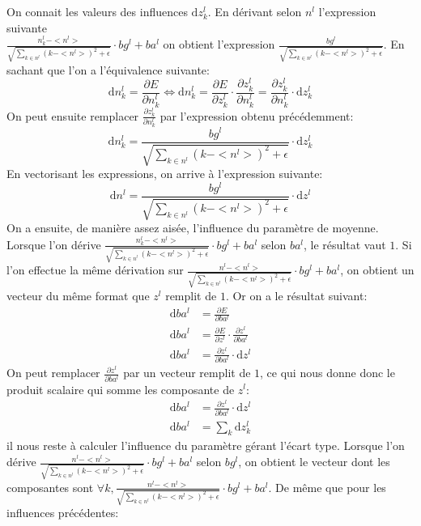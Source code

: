 \documentclass[12pt,a4paper]{extarticle}
\newcommand{\ud}{\mathrm{d}}
\begin{document}
On connait les valeurs des influences $\ud z^l_k$. En dérivant selon $n^l$ l'expression suivante \\ $\frac{n^l_k-<n^l>}{\sqrt{\sum_{k\in n^l}(k-<n^l>)^2+\epsilon}}\cdot bg^l + ba^l$ on obtient l'expression $\frac{bg^l}{\sqrt{\sum_{k\in n^l}(k-<n^l>)^2+\epsilon}}$. En sachant que l'on a l'équivalence suivante:
\begin{equation}
\ud n^l_k = \frac{\partial E}{\partial n^l_k} \Leftrightarrow \ud n^l_k = \frac{\partial E}{\partial z^l_k}\cdot \frac{\partial z^l_k}{\partial n^l_k}=\frac{\partial z^l_k}{\partial n^l_k}\cdot \ud z^l_k
\end{equation}
On peut ensuite remplacer $\frac{\partial z^l_k}{\partial n^l_k}$ par l'expression obtenu précédemment:
\begin{equation}
\ud n^l_k = \frac{bg^l}{\sqrt{\sum_{k\in n^l}(k-<n^l>)^2+\epsilon}}\cdot \ud z^l_k
\end{equation}
En vectorisant les expressions, on arrive à l'expression suivante:
\begin{equation}
\ud n^l = \frac{bg^l}{\sqrt{\sum_{k\in n^l}(k-<n^l>)^2+\epsilon}}\cdot \ud z^l
\end{equation}
On a ensuite, de manière assez aisée, l'influence du paramètre de moyenne. Lorsque l'on dérive $\frac{n^l_k-<n^l>}{\sqrt{\sum_{k\in n^l}(k-<n^l>)^2+\epsilon}}\cdot bg^l + ba^l $ selon $ba^l $, le résultat vaut $1$. Si l'on effectue la même dérivation sur  $ \frac{n^l-<n^l>}{\sqrt{\sum_{k\in n^l}(k-<n^l>)^2+\epsilon}}\cdot bg^l + ba^l $, on obtient un vecteur du même format que $z^l$ remplit de $1$. Or on a le résultat suivant:
\begin{align}
\ud ba^l &= \frac{\partial E}{\partial ba^l}\\
\ud ba^l &= \frac{\partial E}{\partial z^l}\cdot\frac{\partial z^l}{\partial ba^l} \\
\ud ba^l &= \frac{\partial z^l}{\partial ba^l}\cdot \ud z^l 
\end{align}
On peut remplacer $\frac{\partial z^l}{\partial ba^l}$ par un vecteur remplit de $1$, ce qui nous donne donc le produit scalaire qui somme les composante de $z^l$:
\begin{align}
\ud ba^l &= \frac{\partial z^l}{\partial ba^l}\cdot \ud z^l \\
\ud ba^l &= \sum_k \ud z^l_k
\end{align}
il nous reste à calculer l'influence du paramètre gérant l'écart type. Lorsque l'on  \\ dérive $\frac{n^l-<n^l>}{\sqrt{\sum_{k\in n^l}(k-<n^l>)^2+\epsilon}}\cdot bg^l + ba^l$ selon $bg^l$, on obtient le vecteur dont les composantes sont $\forall k, \frac{n^l-<n^l>}{\sqrt{\sum_{k\in n^l}(k-<n^l>)^2+\epsilon}}\cdot bg^l + ba^l$. De même que pour les influences précédentes:
\end{document}
